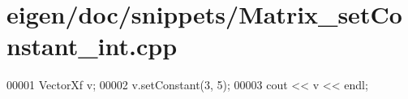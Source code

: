 \hypertarget{eigen_2doc_2snippets_2_matrix__set_constant__int_8cpp_source}{}\section{eigen/doc/snippets/\+Matrix\+\_\+set\+Constant\+\_\+int.cpp}
\label{eigen_2doc_2snippets_2_matrix__set_constant__int_8cpp_source}

\begin{DoxyCode}
00001 VectorXf v;
00002 v.setConstant(3, 5);
00003 cout << v << endl;
\end{DoxyCode}
